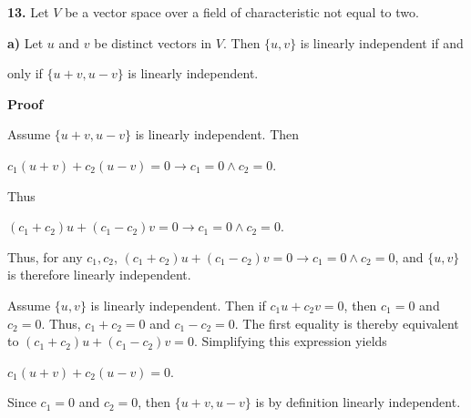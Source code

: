 \documentclass[12pt, a4paper]{article}
\begin{document}
\newpage

\noindent\textbf{13.} Let $V$ be a vector space over a field of characteristic not equal to two.

\vspace{4mm}

\begin{addmargin}[1.4em]{1.4em}

    \noindent\textbf{a)} Let $u$ and $v$ be distinct vectors in $V$. Then $\{u,v\}$ is linearly independent if and\par only if $\{u+v,u-v\}$ is linearly independent.   
    
    \vspace{4mm}
    
    \noindent\textbf{Proof}
    
    \vspace{2mm}
    
    \noindent Assume $\{u+v, u-v\}$ is linearly independent. Then
    
    \vspace{2mm}
    
    \centerline{$c_1(u+v)+c_2(u-v)=0\rightarrow c_1=0\wedge c_2=0$.}
    
    \vspace{2mm}
    
    \noindent Thus
    
    \vspace{2mm}
    
    \centerline{$(c_1+c_2)u+(c_1-c_2)v=0\rightarrow c_1=0\wedge c_2=0$.}
    
    \vspace{2mm}
    
    \noindent Thus, for any $c_1,c_2$, $(c_1+c_2)u+(c_1-c_2)v=0\rightarrow c_1=0\wedge c_2=0$, and $\{u,v\}$ is therefore linearly independent.\par
    
    Assume $\{u,v\}$ is linearly independent. Then if $c_1u+c_2v=0$, then $c_1=0$ and $c_2=0$. Thus, $c_1+c_2=0$ and $c_1-c_2=0$. The first equality is thereby equivalent to $(c_1+c_2)u+(c_1-c_2)v=0$. Simplifying this expression yields
    
    \vspace{2mm}
    
    \centerline{$c_1(u+v)+c_2(u-v)=0$.}
    
    \vspace{2mm}
    
    \noindent Since $c_1=0$ and $c_2=0$, then $\{u+v,u-v\}$ is by definition linearly independent.\par
    \hspace{137mm}\blacksquare

\end{addmargin}
\end{document}
